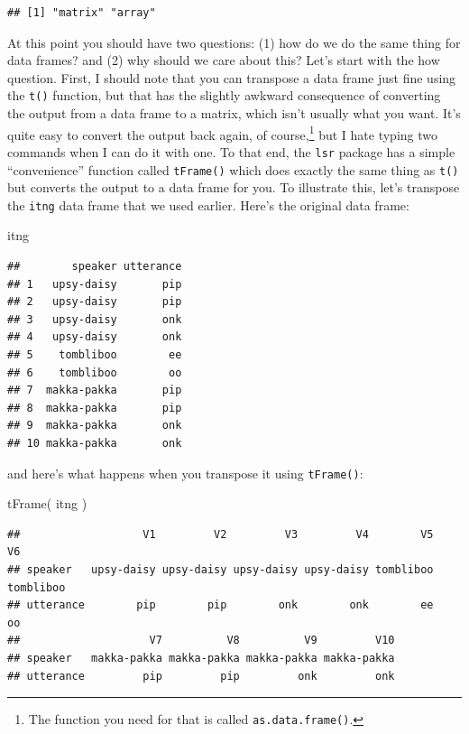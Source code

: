 \documentclass[
]{book}
\newenvironment{Shaded}{\begin{snugshade}}{\end{snugshade}}
\newcommand{\FunctionTok}[1]{\textcolor[rgb]{0.00,0.00,0.00}{#1}}
\newcommand{\NormalTok}[1]{#1}
\begin{document}
\begin{verbatim}
## [1] "matrix" "array"
\end{verbatim}

At this point you should have two questions: (1) how do we do the same thing for data frames? and (2) why should we care about this? Let's start with the how question. First, I should note that you can transpose a data frame just fine using the \texttt{t()} function, but that has the slightly awkward consequence of converting the output from a data frame to a matrix, which isn't usually what you want. It's quite easy to convert the output back again, of course,\footnote{The function you need for that is called \texttt{as.data.frame()}.} but I hate typing two commands when I can do it with one. To that end, the \texttt{lsr} package has a simple ``convenience'' function called \texttt{tFrame()} which does exactly the same thing as \texttt{t()} but converts the output to a data frame for you. To illustrate this, let's transpose the \texttt{itng} data frame that we used earlier. Here's the original data frame:

\begin{Shaded}
\begin{Highlighting}[]
\NormalTok{itng}
\end{Highlighting}
\end{Shaded}

\begin{verbatim}
##        speaker utterance
## 1   upsy-daisy       pip
## 2   upsy-daisy       pip
## 3   upsy-daisy       onk
## 4   upsy-daisy       onk
## 5    tombliboo        ee
## 6    tombliboo        oo
## 7  makka-pakka       pip
## 8  makka-pakka       pip
## 9  makka-pakka       onk
## 10 makka-pakka       onk
\end{verbatim}

and here's what happens when you transpose it using \texttt{tFrame()}:

\begin{Shaded}
\begin{Highlighting}[]
\FunctionTok{tFrame}\NormalTok{( itng )}
\end{Highlighting}
\end{Shaded}

\begin{verbatim}
##                   V1         V2         V3         V4        V5        V6
## speaker   upsy-daisy upsy-daisy upsy-daisy upsy-daisy tombliboo tombliboo
## utterance        pip        pip        onk        onk        ee        oo
##                    V7          V8          V9         V10
## speaker   makka-pakka makka-pakka makka-pakka makka-pakka
## utterance         pip         pip         onk         onk
\end{verbatim}
\end{document}
